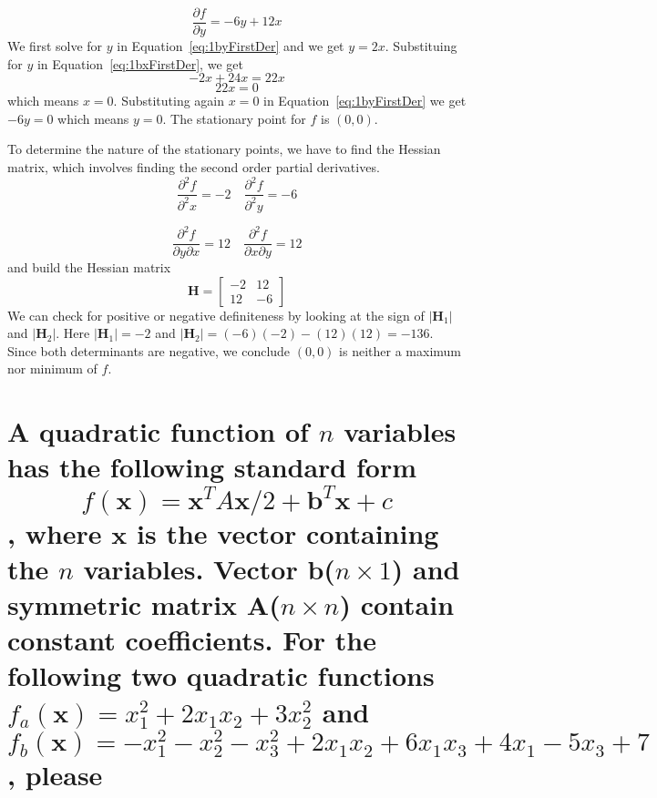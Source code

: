 \documentclass[11pt]{scrartcl}
\newcommand{\vect}{\boldsymbol}
\begin{document}
\begin{equation}
	\label{eq:1byFirstDer}
	\frac{\partial f}{\partial y} = -6y + 12x
\end{equation}
We first solve for $y$ in Equation~\ref{eq:1byFirstDer} and we get $y=2x$.
Substituing for $y$ in Equation~\ref{eq:1bxFirstDer}, we get 
$$-2x + 24x = 22x$$
$$22x = 0$$
which means $x=0$.
Substituting again $x=0$ in Equation~\ref{eq:1byFirstDer} we get $-6y=0$ which means
$y=0$.
The stationary point for $f$ is $(0, 0)$.

To determine the nature of the stationary points, we have to find the Hessian matrix,
which involves finding the second order partial derivatives.
\begin{equation}
	\frac{\partial^{2} f}{\partial^{2} x}=-2\quad \frac{\partial^{2}f}{\partial^{2}y} = -6
\end{equation}

\begin{equation}
	\frac{\partial^{2} f}{\partial y\partial x}=12\quad \frac{\partial^{2}f}{\partial x\partial y} = 12
\end{equation}
and build the Hessian matrix
$$
\boldsymbol{H} = 
\begin{bmatrix}
	-2 & 12\\
	12 & -6
\end{bmatrix}
$$
We can check for positive or negative definiteness by looking at the sign of $|\boldsymbol{H}_1|$ and $|\boldsymbol{H}_{2}|$.
Here $|\boldsymbol{H}_1| = -2$ and $|\boldsymbol{H}_2| = (-6)(-2) -(12)(12) = -136$.
Since both determinants are negative, we conclude $(0, 0)$ is neither a maximum nor minimum of $f$.

\section{A quadratic function of $n$ variables has the following standard form
		$$f(\vect{x}) = \vect{x}^{T}A\vect{x}/2 + \vect{b}^{T}\vect{x} +c$$, 
		where $\vect{x}$ is the vector containing the $n$ variables.
		Vector $\vect{b}$($n\times1$) and symmetric matrix $\vect{A}$($n\times n$) contain
		constant coefficients.
		For the following two quadratic functions $f_a (\vect{x})=x_{1}^{2}+2x_{1}x_{2}+3x_{2}^{2}$
		and $f_b (\vect{x})=-x_{1}^{2}-x_{2}^{2}-x_{3}^{2}+2x_{1}x_{2}+6x_{1}x_{3}+4x_{1}-5x_{3}+7$, please
}
\end{document}

